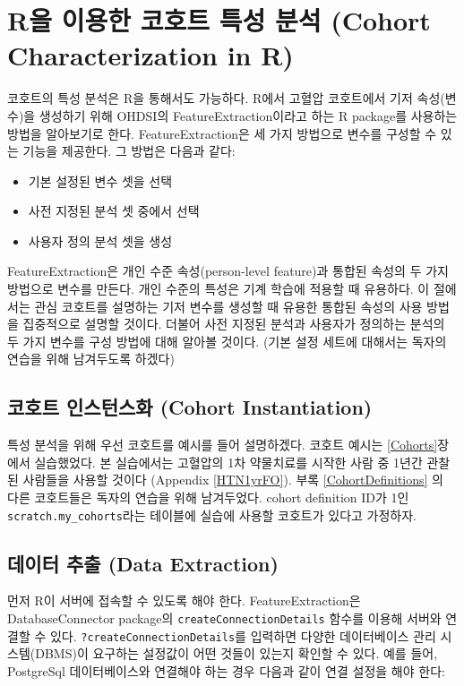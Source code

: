 \documentclass[11pt]{book}
\providecommand{\tightlist}{%
  \setlength{\itemsep}{0pt}\setlength{\parskip}{0pt}}
\theoremstyle{definition}
\theoremstyle{definition}
\theoremstyle{definition}
\theoremstyle{remark}
\begin{document}
\section{R을 이용한 코호트 특성 분석 (Cohort Characterization in
R)}\label{r-----cohort-characterization-in-r}

코호트의 특성 분석은 R을 통해서도 가능하다. R에서 고혈압 코호트에서 기저
속성(변수)을 생성하기 위해 OHDSI의 FeatureExtraction이라고 하는 R
package를 사용하는 방법을 알아보기로 한다. FeatureExtraction은 세 가지
방법으로 변수를 구성할 수 있는 기능을 제공한다. 그 방법은 다음과 같다:

\begin{itemize}
\tightlist
\item
  기본 설정된 변수 셋을 선택
\item
  사전 지정된 분석 셋 중에서 선택
\item
  사용자 정의 분석 셋을 생성
\end{itemize}

FeatureExtraction은 개인 수준 속성(person-level feature)과 통합된 속성의
두 가지 방법으로 변수를 만든다. 개인 수준의 특성은 기계 학습에 적용할 때
유용하다. 이 절에서는 관심 코호트를 설명하는 기저 변수를 생성할 때
유용한 통합된 속성의 사용 방법을 집중적으로 설명할 것이다. 더불어 사전
지정된 분석과 사용자가 정의하는 분석의 두 가지 변수를 구성 방법에 대해
알아볼 것이다. (기본 설정 세트에 대해서는 독자의 연습을 위해 남겨두도록
하겠다)

\subsection{코호트 인스턴스화 (Cohort
Instantiation)}\label{--cohort-instantiation}

특성 분석을 위해 우선 코호트를 예시를 들어 설명하겠다. 코호트 예시는
\ref{Cohorts}장에서 실습했었다. 본 실습에서는 고혈압의 1차 약물치료를
시작한 사람 중 1년간 관찰된 사람들을 사용할 것이다 (Appendix
\ref{HTN1yrFO}). 부록 \ref{CohortDefinitions} 의 다른 코호트들은 독자의
연습을 위해 남겨두었다. cohort definition ID가 1인
\texttt{scratch.my\_cohorts}라는 테이블에 실습에 사용할 코호트가 있다고
가정하자.

\subsection{데이터 추출 (Data Extraction)}\label{--data-extraction}

먼저 R이 서버에 접속할 수 있도록 해야 한다. FeatureExtraction은
DatabaseConnector package의 \texttt{createConnectionDetails} 함수를
이용해 서버와 연결할 수 있다. \texttt{?createConnectionDetails}를
입력하면 다양한 데이터베이스 관리 시스템(DBMS)이 요구하는 설정값이 어떤
것들이 있는지 확인할 수 있다. 예를 들어, PostgreSql 데이터베이스와
연결해야 하는 경우 다음과 같이 연결 설정을 해야 한다:
\end{document}
